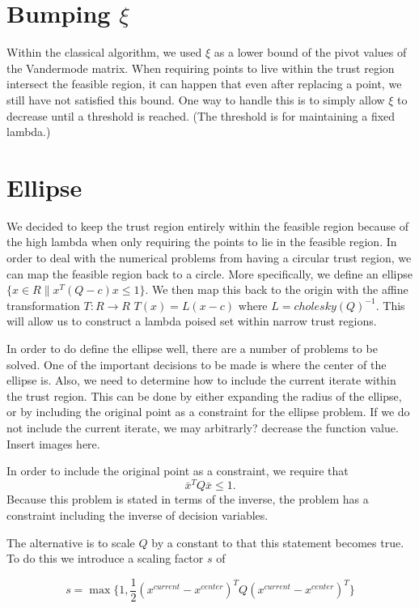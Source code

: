 \documentclass{article}
\begin{document}
\section{Bumping $\xi$}


Within the classical algorithm, we used $\xi$ as a lower bound of the pivot values of the Vandermode matrix.
When requiring points to live within the trust region intersect the feasible region, it can happen that even after replacing a point, we still have not satisfied this bound.
One way to handle this is to simply allow $\xi$ to decrease until a threshold is reached.
(The threshold is for maintaining a fixed lambda.)


    
\section{Ellipse}


We decided to keep the trust region entirely within the feasible region because of the high lambda when only requiring the points to lie in the feasible region.
In order to deal with the numerical problems from having a circular trust region, we can map the feasible region back to a circle.
More specifically, we define an ellipse $\{x \in R \| x^T (Q - c) x \le 1 \}$.
We then map this back to the origin with the affine transformation $T : R \to R$ $T(x) = L(x-c)$ where $L = cholesky(Q)^{-1}$.
This will allow us to construct a lambda poised set within narrow trust regions.


In order to do define the ellipse well, there are a number of problems to be solved.
One of the important decisions to be made is where the center of the ellipse is.
Also, we need to determine how to include the current iterate within the trust region.
This can be done by either expanding the radius of the ellipse, or by including the original point as a constraint for the ellipse problem.
If we do not include the current iterate, we may arbitrarly? decrease the function value.
Insert images here.

In order to include the original point as a constraint, we require that
$$
\bar{x}^T Q \bar{x} \le 1.
$$
Because this problem is stated in terms of the inverse, the problem has a constraint including the inverse of decision variables.

The alternative is to scale $Q$ by a constant to that this statement becomes true.
To do this we introduce a scaling factor $s$ of

$$ s = \max \{1, \frac 1 {2} (x^{current} - x^{center})^T Q (x^{current} - x^{center})^T \}$$
\end{document}
